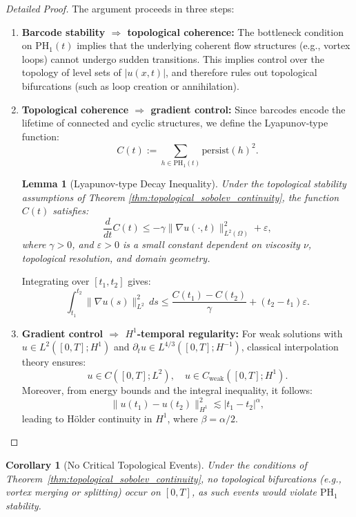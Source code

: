 \documentclass[11pt]{article}
\newtheorem{lemma}[theorem]{Lemma}
\newtheorem{corollary}[theorem]{Corollary}
\theoremstyle{definition}
\begin{document}
\begin{proof}[Detailed Proof]
The argument proceeds in three steps:

\begin{enumerate}
    \item \textbf{Barcode stability $\Rightarrow$ topological coherence:} The bottleneck condition on $\mathrm{PH}_1(t)$ implies that the underlying coherent flow structures (e.g., vortex loops) cannot undergo sudden transitions. This implies control over the topology of level sets of $|u(x,t)|$, and therefore rules out topological bifurcations (such as loop creation or annihilation).

    \item \textbf{Topological coherence $\Rightarrow$ gradient control:} Since barcodes encode the lifetime of connected and cyclic structures, we define the Lyapunov-type function:
    \[
    C(t) := \sum_{h \in \mathrm{PH}_1(t)} \mathrm{persist}(h)^2.
    \]

    \begin{lemma}[Lyapunov-type Decay Inequality]
    \label{lem:lyapunov_decay}
    Under the topological stability assumptions of Theorem \ref{thm:topological_sobolev_continuity}, the function $C(t)$ satisfies:
    \[
    \frac{d}{dt}C(t) \leq -\gamma \|\nabla u(\cdot,t)\|_{L^2(\Omega)}^2 + \varepsilon,
    \]
    where $\gamma > 0$, and $\varepsilon > 0$ is a small constant dependent on viscosity $\nu$, topological resolution, and domain geometry.
    \end{lemma}

    Integrating over $[t_1,t_2]$ gives:
    \[
    \int_{t_1}^{t_2} \|\nabla u(s)\|_{L^2}^2 \, ds \leq \frac{C(t_1)-C(t_2)}{\gamma} + (t_2 - t_1)\varepsilon.
    \]

    \item \textbf{Gradient control $\Rightarrow$ $H^1$-temporal regularity:}
    For weak solutions with $u \in L^2([0,T]; H^1)$ and $\partial_t u \in L^{4/3}([0,T]; H^{-1})$, classical interpolation theory ensures:
    \[
    u \in C([0,T]; L^2), \quad u \in C_{\text{weak}}([0,T]; H^1).
    \]
    Moreover, from energy bounds and the integral inequality, it follows:
    \[
    \|u(t_1) - u(t_2)\|_{H^1}^2 \lesssim |t_1 - t_2|^{\alpha},
    \]
    leading to Hölder continuity in $H^1$, where $\beta = \alpha/2$.
\end{enumerate}
\end{proof}

\begin{corollary}[No Critical Topological Events]
Under the conditions of Theorem~\ref{thm:topological_sobolev_continuity}, no topological bifurcations (e.g., vortex merging or splitting) occur on $[0,T]$, as such events would violate $\mathrm{PH}_1$ stability.
\end{corollary}
\end{document}
